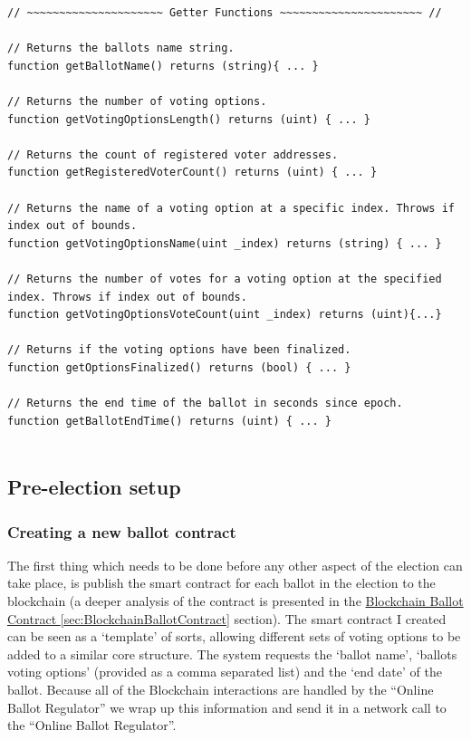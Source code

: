 \documentclass{article}
\begin{document}
\begin{lstlisting}[caption=Summary of getter functions.]
// ~~~~~~~~~~~~~~~~~~~~~ Getter Functions ~~~~~~~~~~~~~~~~~~~~~~ //

// Returns the ballots name string.
function getBallotName() returns (string){ ... }

// Returns the number of voting options.
function getVotingOptionsLength() returns (uint) { ... }

// Returns the count of registered voter addresses.
function getRegisteredVoterCount() returns (uint) { ... }

// Returns the name of a voting option at a specific index. Throws if index out of bounds.
function getVotingOptionsName(uint _index) returns (string) { ... }

// Returns the number of votes for a voting option at the specified index. Throws if index out of bounds.
function getVotingOptionsVoteCount(uint _index) returns (uint){...}

// Returns if the voting options have been finalized.
function getOptionsFinalized() returns (bool) { ... }

// Returns the end time of the ballot in seconds since epoch.
function getBallotEndTime() returns (uint) { ... }
    
\end{lstlisting}



\cleardoublepage
\subsection{Pre-election setup}
\subsubsection{Creating a new ballot contract}
\label{sec:CreatingANewBallotContract}
The first thing which needs to be done before any other aspect of the election can take place, is publish the smart contract for each ballot in the election to the blockchain (a deeper analysis of the contract is presented in the \hyperref[sec:BlockchainBallotContract]{Blockchain Ballot Contract \ref*{sec:BlockchainBallotContract}} section). The smart contract I created can be seen as a `template' of sorts, allowing different sets of voting options to be added to a similar core structure. The system requests the `ballot name', `ballots voting options' (provided as a comma separated list) and the `end date' of the ballot. Because all of the Blockchain interactions are handled by the ``Online Ballot Regulator'' we wrap up this information and send it in a network call to the ``Online Ballot Regulator''.
\end{document}
